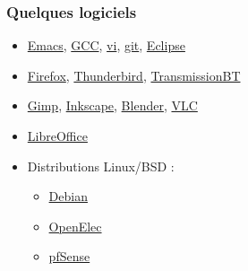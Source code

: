 \documentclass[10pt]{beamer}
\begin{document}

\begin{frame}
  \frametitle{Quelques logiciels}  

  \begin{itemize}
  \item 
    \href{http://www.gnu.org/s/emacs}{Emacs},
    \href{http://gcc.gnu.org}{GCC},
    \href{http://thomer.com/vi/vi.html}{vi},
    \href{http://git-scm.com}{git},
    \href{http://www.eclipse.org}{Eclipse}
    \vfill
  \item
    \href{https://www.mozilla.org/fr/firefox/}{Firefox},
    \href{https://www.mozilla.org/fr/thunderbird}{Thunderbird},
    \href{http://www.transmissionbt.com/}{TransmissionBT}
    \vfill
  \item
    \href{http://www.gimp.org/}{Gimp},
    \href{http://www.inkscape.org/fr/}{Inkscape},
    \href{http://www.blender.org/}{Blender},
    \href{https://www.videolan.org/index.fr.html}{VLC}
    \vfill
  \item \href{https://libreoffice.org}{LibreOffice}
    \vfill
  \item Distributions Linux/BSD :
    \begin{itemize}
    \item \href{http://www.debian.org/}{Debian}
    \item \href{http://openelec.tv/}{OpenElec}
    \item \href{http://www.pfsense.org/}{pfSense}
    \end{itemize}
  \end{itemize}
\end{frame}

\end{document}
